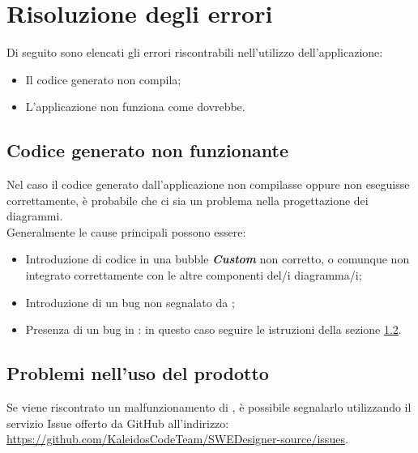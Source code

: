\documentclass[../ManualeUtente.tex]{subfiles}
\begin{document}
	\section{Risoluzione degli errori}
		Di seguito sono elencati gli errori riscontrabili nell'utilizzo dell'applicazione:
		\begin{itemize}
			\item Il codice generato non compila;
			\item L'applicazione non funziona come dovrebbe.
		\end{itemize}
		\subsection{Codice generato non funzionante}
			Nel caso il codice generato dall'applicazione non compilasse oppure non eseguisse correttamente, è
			probabile che ci sia un problema nella progettazione dei diagrammi.\\
			Generalmente le cause principali possono essere:
			\begin{itemize}
				\item Introduzione di codice in una bubble \textit{\textbf{Custom}} non corretto, o comunque non
				integrato correttamente con le altre componenti del/i diagramma/i;
				\item Introduzione di un bug non segnalato da \progetto;
				\item Presenza di un bug in \progetto: in questo caso seguire le istruzioni della sezione \ref{sez:ProblemiProdotto}.
			\end{itemize}
		\subsection{Problemi nell'uso del prodotto}\label{sez:ProblemiProdotto}
			Se viene riscontrato un malfunzionamento di \progetto, è possibile segnalarlo utilizzando il servizio
			Issue offerto da GitHub all'indirizzo: \url{https://github.com/KaleidosCodeTeam/SWEDesigner-source/issues}.
\end{document}
